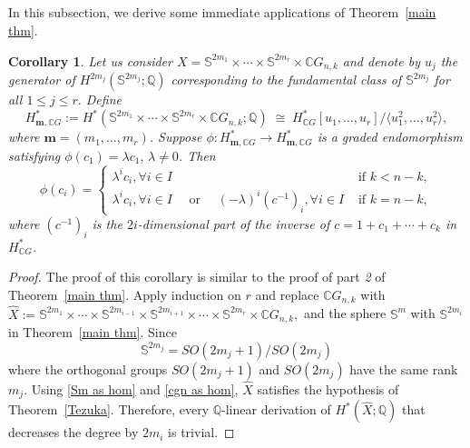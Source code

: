 \documentclass{amsart}
\newtheorem{corollary}[theorem]{Corollary}
\newcommand{\thmref}[1]{Theorem~\ref{#1}}
\begin{document}
	\subsection{} In this subsection, we derive some immediate applications of \thmref{main thm}.
	\begin{corollary}
		Let us consider $X = \mathbb{S}^{2m_1} \times \cdots \times \mathbb{S}^{2m_r} \times \mathbb{C}G_{n,k}$ and denote by $u_j$ the generator of $H^{2m_j}(\mathbb{S}^{2m_j}; \mathbb{Q})$ corresponding to the fundamental class of $\mathbb S^{2m_j}$ for all $1\leq j \leq r.$ Define  
		\[
		H^*_{\mathbf{m}, \mathbb{C}G} := H^*(\mathbb{S}^{2m_1} \times \cdots \times \mathbb{S}^{2m_r} \times \mathbb{C}G_{n,k}; \mathbb{Q})
		\;\cong\; H^*_{\mathbb{C}G}[u_1,\ldots,u_r] \big/ \langle u_1^2,\ldots,u_r^2 \rangle,
		\] where $\mathbf{m} = (m_1, \ldots, m_r)$.
		Suppose $\phi: H^*_{\mathbf{m}, \mathbb{C}G} \to H^*_{\mathbf{m}, \mathbb{C}G}$ is a graded endomorphism satisfying $\phi(c_1)=\lambda c_1,\, \lambda \neq 0$. Then $$\phi(c_i) = \begin{cases}
			\lambda^i c_i,   \forall i \in I& \text{ if } k<n-k,\\
			\lambda^i c_i,  \forall i \in I \quad \text{ or } \quad(-\lambda)^i (c^{-1})_i,    \forall i \in I & \text{ if } k= n-k,
		\end{cases}$$
		where $ (c^{-1})_i $ is the $ 2i $-dimensional part of the inverse of $ c = 1 + c_1 + \cdots + c_k $ in $ H^*_{ \mathbb CG} $. 
	\end{corollary}
	\begin{proof}
		The proof of this corollary is similar to the proof of part \textit{2} of \thmref{main thm}. Apply induction on $r$ and replace $\mathbb{C}G_{n,k}$ with $\hat{X} := \mathbb{S}^{2m_1}\times\cdots\times \mathbb{S}^{2m_{i-1}}\times \mathbb{S}^{2m_{i+1}}\times\cdots\times \mathbb{S}^{2m_r}\times \mathbb{C}G_{n,k},$ and the sphere $\mathbb{S}^m$ with $\mathbb{S}^{2m_i}$ in \thmref{main thm}. Since \begin{equation}\label{Sm as hom}
			\mathbb S^{2m_j}=SO(2m_j+1)/SO(2m_j)
		\end{equation}
		where the orthogonal groups $SO(2m_j+1)$ and $SO(2m_j)$ have the same rank $m_j$. Using \eqref{Sm as hom} and \eqref{cgn as hom}, $\hat{X}$ satisfies the hypothesis of \thmref{Tezuka}. Therefore, every $\mathbb{Q}$-linear derivation of $H^*(\hat{X};\mathbb{Q})$ that decreases the degree by $2m_i$ is trivial.
	\end{proof}
\end{document}
